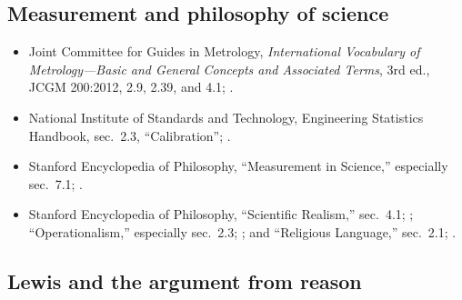 \subsection*{Measurement and philosophy of science}

{\fontsize{8.6}{9.6}\selectfont
\begin{itemize}[itemsep=0pt,parsep=0pt,topsep=0.05em]
\item Joint Committee for Guides in Metrology, \emph{International Vocabulary of Metrology---Basic and General Concepts and Associated Terms}, 3rd ed., JCGM 200:2012, 2.9, 2.39, and 4.1; .
\item National Institute of Standards and Technology, Engineering Statistics Handbook, sec.~2.3, ``Calibration''; .
\item Stanford Encyclopedia of Philosophy, ``Measurement in Science,'' especially sec.~7.1; .
\item Stanford Encyclopedia of Philosophy, ``Scientific Realism,'' sec.~4.1; ; ``Operationalism,'' especially sec.~2.3; ; and ``Religious Language,'' sec.~2.1; .
\end{itemize}}

\subsection*{Lewis and the argument from reason}

